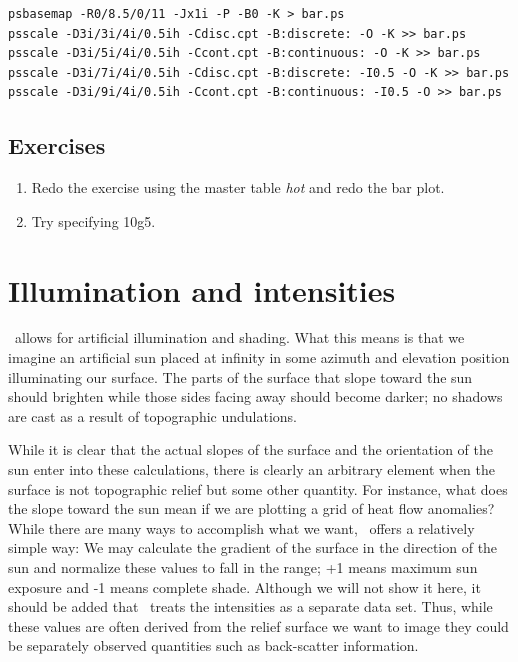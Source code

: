 \documentclass{report}
\begin{document}
{\small\begin{verbatim}
psbasemap -R0/8.5/0/11 -Jx1i -P -B0 -K > bar.ps
psscale -D3i/3i/4i/0.5ih -Cdisc.cpt -B:discrete: -O -K >> bar.ps
psscale -D3i/5i/4i/0.5ih -Ccont.cpt -B:continuous: -O -K >> bar.ps
psscale -D3i/7i/4i/0.5ih -Cdisc.cpt -B:discrete: -I0.5 -O -K >> bar.ps
psscale -D3i/9i/4i/0.5ih -Ccont.cpt -B:continuous: -I0.5 -O >> bar.ps
\end{verbatim}
}

\subsection{Exercises}

\begin{enumerate}

\item Redo the  exercise using the master table
{\it hot} and redo the bar plot.

\item Try specifying 10g5.

\end{enumerate}

\section{Illumination and intensities}

\GMT\ allows for artificial illumination and shading.  What this
means is that we imagine an artificial sun placed at infinity in
some azimuth and elevation position illuminating our surface.
The parts of the surface that slope toward the sun should brighten
while those sides facing away should become darker; no shadows are
cast as a result of topographic undulations.

While it is clear that the actual slopes of the surface and the
orientation of the sun enter into these calculations, there is
clearly an arbitrary element when the surface is not topographic
relief but some other quantity.  For instance, what does the slope
toward the sun mean if we are plotting a grid of heat flow anomalies?
While there are many ways to accomplish what we want, \GMT\ offers
a relatively simple way:  We may calculate the gradient of the surface
in the direction of the sun and normalize these values to fall in
the  range; +1 means maximum sun exposure and -1 means complete
shade. Although we will not show it here, it should be added that
\GMT\ treats the intensities as a separate data set.  Thus, while
these values are often derived from the relief surface we want to
image they could be separately observed quantities such as back-scatter
information.
\end{document}
